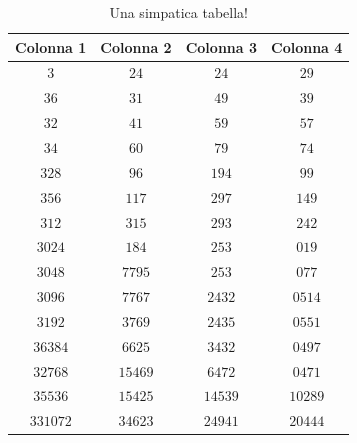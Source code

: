 \begin{table}
    \caption{Una simpatica tabella!}\label{tab:labelTabella}
    \begin{center}
    \begin{tabular}{c|c|c|c}
        \textbf{Colonna 1} & \textbf{Colonna 2} & \textbf{Colonna 3} & \textbf{Colonna 4} \\
        \hline
            $3$      & $24$     & $24$    & $29$ \\ 
            $36$     & $31$     & $49$    & $39$ \\ 
            $32$     & $41$     & $59$    & $57$ \\ 
            $34$     & $60$     & $79$    & $74$ \\ 
            $328$    & $96$     & $194$   & $99$ \\ 
            $356$    & $117$    & $297$   & $149$ \\ 
            $312$    & $315$    & $293$   & $242$ \\ 
            $3024$   & $184$    & $253$   & $019$ \\ 
            $3048$   & $7795$   & $253$   & $077$ \\ 
            $3096$   & $7767$   & $2432$  & $0514$ \\ 
            $3192$   & $3769$   & $2435$  & $0551$ \\ 
            $36384$  & $6625$   & $3432$  & $0497$ \\ 
            $32768$  & $15469$  & $6472$  & $0471$ \\ 
            $35536$  & $15425$  & $14539$ & $10289$ \\ 
            $331072$ & $34623$  & $24941$ & $20444$ \\  
        \end{tabular}
    \end{center}
\end{table}